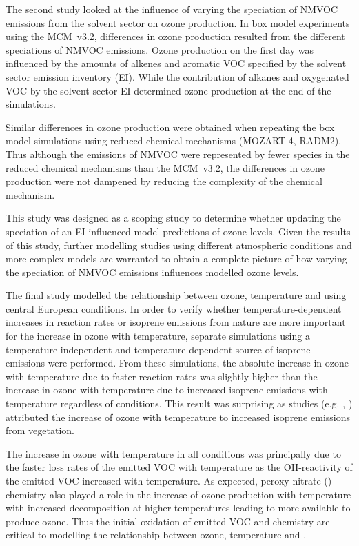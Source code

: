 The second study looked at the influence of varying the speciation of NMVOC emissions from the solvent sector on ozone production.
In box model experiments using the MCM~v3.2, differences in ozone production resulted from the different speciations of NMVOC emissions.
Ozone production on the first day was influenced by the amounts of alkenes and aromatic VOC specified by the solvent sector emission inventory (EI).
While the contribution of alkanes and oxygenated VOC by the solvent sector EI determined ozone production at the end of the simulations.

Similar differences in ozone production were obtained when repeating the box model simulations using reduced chemical mechanisms (MOZART-4, RADM2).
Thus although the emissions of NMVOC were represented by fewer species in the reduced chemical mechanisms than the MCM~v3.2, the differences in ozone production were not dampened by reducing the complexity of the chemical mechanism.

This study was designed as a scoping study to determine whether updating the speciation of an EI influenced model predictions of ozone levels.
Given the results of this study, further modelling studies using different atmospheric conditions and more complex models are warranted to obtain a complete picture of how varying the speciation of NMVOC emissions influences modelled ozone levels.

The final study modelled the relationship between ozone, temperature and  using central European conditions.
In order to verify whether temperature-dependent increases in reaction rates or isoprene emissions from nature are more important for the increase in ozone with temperature, separate simulations using a temperature-independent and temperature-dependent source of isoprene emissions were performed.
From these simulations, the absolute increase in ozone with temperature due to faster reaction rates was slightly higher than the increase in ozone with temperature due to increased isoprene emissions with temperature regardless of  conditions.
This result was surprising as studies (e.g. \citet{Racherla:2008}, \citet{Doherty:2013}) attributed the increase of ozone with temperature to increased isoprene emissions from vegetation.

The increase in ozone with temperature in all  conditions was principally due to the faster loss rates of the emitted VOC with temperature as the OH-reactivity of the emitted VOC increased with temperature.
As expected, peroxy nitrate () chemistry also played a role in the increase of ozone production with temperature with increased  decomposition at higher temperatures leading to more  available to produce ozone.
Thus the initial oxidation of emitted VOC and  chemistry are critical to modelling the relationship between ozone, temperature and .


